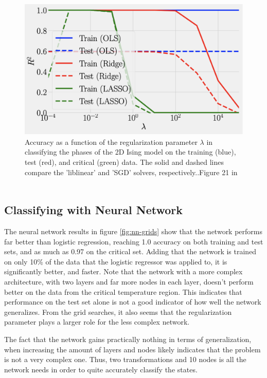 \begin{figure}[H]
\includegraphics[width = 0.6\paperwidth]{figures/R2_article.png}
\caption{Accuracy as a function of the regularization parameter
\(\lambda\) in classifying the phases of the 2D Ising model on the
training (blue), test (red), and critical (green) data. The solid
and dashed lines compare the ’liblinear’ and ’SGD’ solvers, respectively..Figure 21 in ~\cite{HighBias}} 
\label{fig:logistic-article}
\end{figure}


\subsection{Classifying with Neural Network}
The neural network results in figure \ref{fig:nn-grids} show that the network
performs far better than logistic regression, reaching 1.0 accuracy on both training and
test sets, and as much as 0.97 on the critical set. Adding that the network is trained
on only 10\% of the data that the logistic regressor was applied to, it is significantly better,
and faster.
Note that the network with a more complex architecture, with two layers and far more nodes in 
each layer, doesn't perform better on the data from the critical temperature region. 
This indicates that performance on the test set alone is not a good indicator of how well
the network generalizes. From the grid searches, it also seems that the regularization
parameter plays a larger role for the less complex network.

The fact that the network gains practically nothing in terms of generalization,
when increasing the amount of layers and nodes likely indicates that the problem
is not a very complex one. Thus, two transformations and 10 nodes is all the
network needs in order to quite accurately classify the states.
